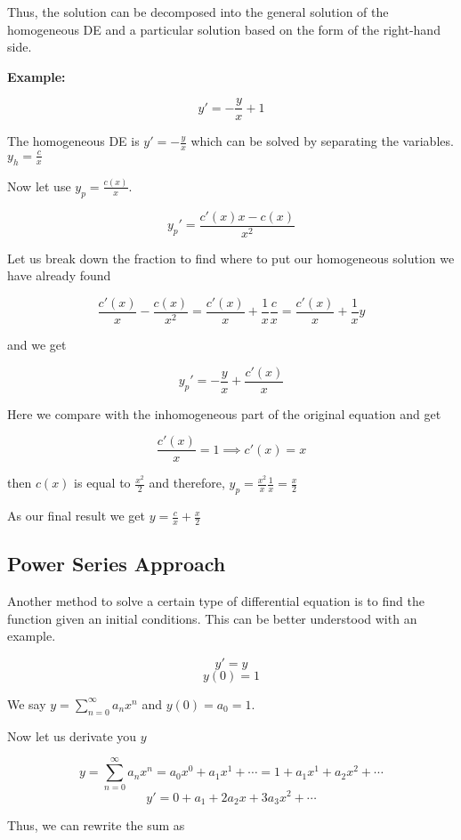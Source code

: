 Thus, the solution can be decomposed into the general solution of the homogeneous DE and a 
particular solution based on the form of the right-hand side.
\vspace{\baselineskip}

\textbf{Example: }

\[
    y' = -\frac{y}{x} + 1
\]

The homogeneous DE is \(y' = -\frac{y}{x}\) which can be solved by separating the variables.
\(y_h = \frac{c}{x}\)

Now let use \(y_p = \frac{c(x)}{x}\).

\[
    y_{p}' = \frac{c'(x)x - c(x)}{x^2}
\]

Let us break down the fraction to find where to put our homogeneous solution we have already found

\[
    \frac{c'(x)}{x} - \frac{c(x)}{x^2} = \frac{c'(x)}{x} + \frac{1}{x}\frac{c}{x} 
    = \frac{c'(x)}{x} + \frac{1}{x}y
\]

and we get

\[
    y_{p}' = -\frac{y}{x} + \frac{c'(x)}{x} 
\]

Here we compare with the inhomogeneous part of the original equation and get

\[
    \frac{c'(x)}{x} = 1 \implies c'(x) = x
\]

then \(c(x)\) is equal to \(\frac{x^2}{2}\) and therefore, \(y_p = \frac{x^2}{x}\frac{1}{x} = 
\frac{x}{2}\)
\vspace{\baselineskip}

As our final result we get \(y = \frac{c}{x} + \frac{x}{2}\)

\subsection{Power Series Approach}

Another method to solve a certain type  of differential equation
is to find the function given an initial conditions. This can be better understood with an example.

\[
    y' = y
\]
\[
    y(0) = 1
\]

We say \(y = \sum_{n = 0}^{\infty} a_n x^n\) and \(y(0) = a_0 = 1\).

Now let us derivate you \(y\)

\[
    y = \sum_{n = 0}^{\infty} a_n x^n = a_0 x^0 + a_1 x^1 + \cdots = 1 + a_1 x^1 + a_2 x^2 + \cdots
\]
\[
    y' = 0  + a_1 + 2 a_2 x + 3 a_3 x^2 + \cdots 
\]

Thus, we can rewrite the sum as 


